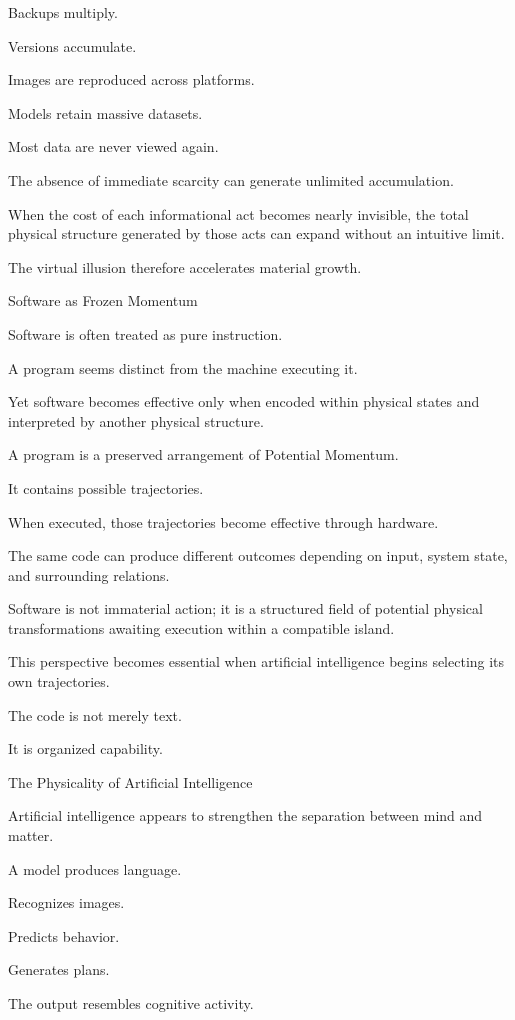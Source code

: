 Backups multiply.

Versions accumulate.

Images are reproduced across platforms.

Models retain massive datasets.

Most data are never viewed again.

The absence of immediate scarcity can generate unlimited accumulation.

When the cost of each informational act becomes nearly invisible, the total physical structure generated by those acts can expand without an intuitive limit.

The virtual illusion therefore accelerates material growth.

Software as Frozen Momentum

Software is often treated as pure instruction.

A program seems distinct from the machine executing it.

Yet software becomes effective only when encoded within physical states and interpreted by another physical structure.

A program is a preserved arrangement of Potential Momentum.

It contains possible trajectories.

When executed, those trajectories become effective through hardware.

The same code can produce different outcomes depending on input, system state, and surrounding relations.

Software is not immaterial action; it is a structured field of potential physical transformations awaiting execution within a compatible island.

This perspective becomes essential when artificial intelligence begins selecting its own trajectories.

The code is not merely text.

It is organized capability.

The Physicality of Artificial Intelligence

Artificial intelligence appears to strengthen the separation between mind and matter.

A model produces language.

Recognizes images.

Predicts behavior.

Generates plans.

The output resembles cognitive activity.

